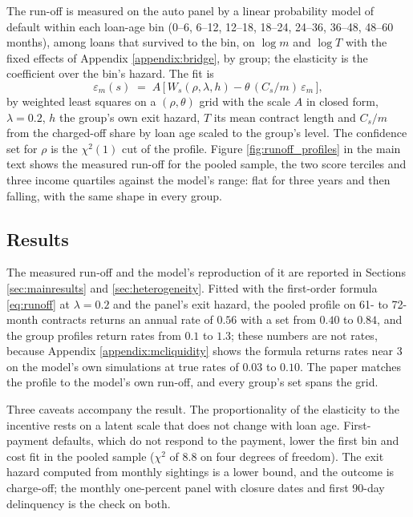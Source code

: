The run-off is measured on the auto panel by a linear probability model of default within each loan-age bin (0--6, 6--12, 12--18, 18--24, 24--36, 36--48, 48--60 months), among loans that survived to the bin, on $\log m$ and $\log T$ with the fixed effects of Appendix \ref{appendix:bridge}, by group; the elasticity is the coefficient over the bin's hazard. The fit is
\begin{equation}
\varepsilon_m(s) \;=\; A\,\big[\,W_s(\rho, \lambda, h) - \theta\,(C_s/m)\,\varepsilon_m\,\big],
\label{eq:runoff}
\end{equation}
by weighted least squares on a $(\rho, \theta)$ grid with the scale $A$ in closed form, $\lambda = 0.2$, $h$ the group's own exit hazard, $T$ its mean contract length and $C_s/m$ from the charged-off share by loan age scaled to the group's level. The confidence set for $\rho$ is the $\chi^2(1)$ cut of the profile. Figure \ref{fig:runoff_profiles} in the main text shows the measured run-off for the pooled sample, the two score terciles and three income quartiles against the model's range: flat for three years and then falling, with the same shape in every group.



\subsection{Results}
The measured run-off and the model's reproduction of it are reported in Sections \ref{sec:mainresults} and \ref{sec:heterogeneity}. Fitted with the first-order formula \eqref{eq:runoff} at $\lambda = 0.2$ and the panel's exit hazard, the pooled profile on 61- to 72-month contracts returns an annual rate of $0.56$ with a set from $0.40$ to $0.84$, and the group profiles return rates from $0.1$ to $1.3$; these numbers are not rates, because Appendix \ref{appendix:mcliquidity} shows the formula returns rates near $3$ on the model's own simulations at true rates of $0.03$ to $0.10$. The paper matches the profile to the model's own run-off, and every group's set spans the grid.

Three caveats accompany the result. The proportionality of the elasticity to the incentive rests on a latent scale that does not change with loan age. First-payment defaults, which do not respond to the payment, lower the first bin and cost fit in the pooled sample ($\chi^2$ of 8.8 on four degrees of freedom). The exit hazard computed from monthly sightings is a lower bound, and the outcome is charge-off; the monthly one-percent panel with closure dates and first 90-day delinquency is the check on both.
